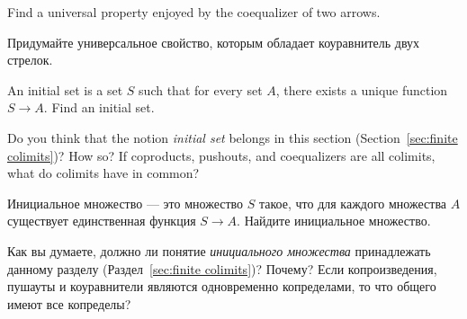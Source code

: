 \documentclass[CT4S-EN-RU]{subfiles}
\begin{document}
\begin{exerciseENG}
Find a universal property enjoyed by the coequalizer of two arrows.
\end{exerciseENG}

\begin{exerciseRUS}
Придумайте универсальное свойство, которым обладает коуравнитель двух стрелок.
\end{exerciseRUS}

\begin{exerciseENG}\label{exc:initial set}
An initial set is a set $S$ such that for every set $A$, there exists a unique function $S\to A$. 
\sexc Find an initial set. 
\item Do you think that the notion {\em initial set} belongs in this section (Section~\ref{sec:finite colimits})? How so? If coproducts, pushouts, and coequalizers are all colimits, what do colimits have in common?
\endsexc
\end{exerciseENG}

\begin{exerciseRUS}\label{exc:initial set}
Инициальное множество — это множество $S$ такое, что для каждого множества $A$ существует единственная функция $S\to A$. 
\sexc Найдите инициальное множество. 
\item Как вы думаете, должно ли понятие {\em инициального множества} принадлежать данному разделу (Раздел~\ref{sec:finite colimits})? Почему? Если копроизведения, пушауты и коуравнители являются одновременно копределами, то что общего имеют все копределы?
\endsexc
\end{exerciseRUS}
\end{document}
